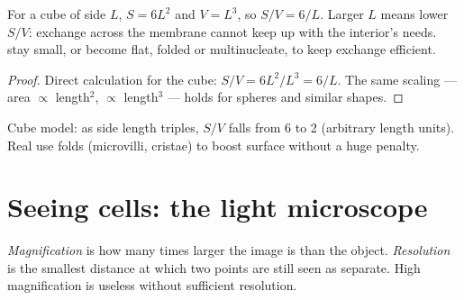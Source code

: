 \begin{proposition}\label{prop:g10:the-cell:size}
For a cube of side $L$,  $S = 6L^2$ and  $V = L^3$, so
$S/V = 6/L$. Larger $L$ means lower $S/V$: exchange across the membrane
cannot keep up with the interior's needs.  stay small, or become
flat, folded or multinucleate, to keep exchange efficient.
\end{proposition}

\begin{proof}
Direct calculation for the cube: $S/V = 6L^2/L^3 = 6/L$. The same
scaling --- area $\propto$ length$^2$,  $\propto$ length$^3$ ---
holds for spheres and similar shapes.
\end{proof}

\begin{omfigure}

{\small Cube model: as side length triples, $S/V$ falls from 6 to 2
(arbitrary length units). Real  use folds (microvilli, cristae)
to boost surface without a huge  penalty.}
\end{omfigure}

\section{Seeing cells: the light microscope}

\begin{definition}\label{def:g10:the-cell:microscope}
\emph{Magnification} is how many times larger the
image is than the object. \emph{Resolution} is the smallest distance at which two points are still
seen as separate. High magnification is useless without sufficient
resolution.
\end{definition}

